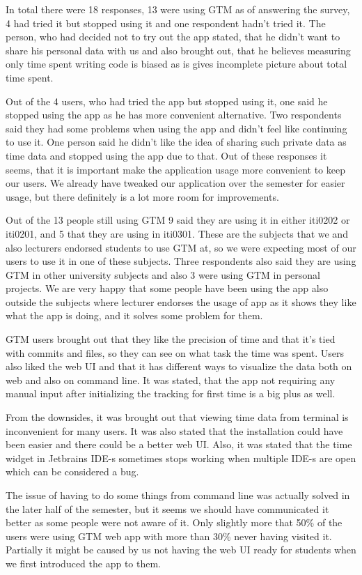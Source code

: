 In total there were 18 responses, 13 were using GTM as of answering the survey, 4 had tried it but stopped using it and one respondent hadn't tried it.
The person, who had decided not to try out the app stated, that he didn't want to share his personal data with us and also brought out,
that he believes measuring only time spent writing code is biased as is gives incomplete picture about total time spent.

Out of the 4 users, who had tried the app but stopped using it, one said he stopped using the app as he has more convenient alternative.
Two respondents said they had some problems when using the app and didn't feel like continuing to use it.
One person said he didn't like the idea of sharing such private data as time data and stopped using the app due to that.
Out of these responses it seems, that it is important make the application usage more convenient to keep our users.
We already have tweaked our application over the semester for easier usage, but there definitely is a lot more room for improvements.

Out of the 13 people still using GTM 9 said they are using it in either iti0202 or iti0201, and 5 that they are using in iti0301.
These are the subjects that we and also lecturers endorsed students to use GTM at, so we were expecting most of our
users to use it in one of these subjects.
Three respondents also said they are using GTM in other university subjects and also 3 were using GTM in personal projects.
We are very happy that some people have been using the app also outside the subjects where lecturer endorses the usage of app
as it shows they like what the app is doing, and it solves some problem for them.

GTM users brought out that they like the precision of time and that it's tied with commits and files, so they can see
on what task the time was spent.
Users also liked the web UI and that it has different ways to visualize the data both on web and also on command line.
It was stated, that the app not requiring any manual input after initializing the tracking for first time is a big plus as well.

From the downsides, it was brought out that viewing time data from terminal is inconvenient for many users.
It was also stated that the installation could have been easier and there could be a better web UI.
Also, it was stated that the time widget in Jetbrains IDE-s sometimes stops working when multiple IDE-s are open
which can be considered a bug.

The issue of having to do some things from command line was actually solved in the later half of the semester, but it seems
we should have communicated it better as some people were not aware of it.
Only slightly more that 50\% of the users were using GTM web app with more than 30\% never having visited it.
Partially it might be caused by us not having the web UI ready for students when we first introduced the app to them.

